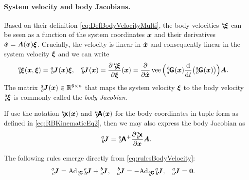 \paragraph{System velocity and body Jacobians.}
Based on their definition \eqref{eq:DefBodyVelocityMulti}, the body velocities $\bodyVel{\BidxI}{\BidxII}$ can be seen as a function of the system coordinates $\boldsymbol{x}$ and their derivatives $\dot{\boldsymbol{x}} = \boldsymbol{A}(\boldsymbol{x})\boldsymbol{\xi}$.
Crucially, the velocity is linear in $\dot{\boldsymbol{x}}$ and consequently linear in the system velocity $\boldsymbol{\xi}$ and we can write
\begin{align}\label{eq:DefBodyJacobian}
 \bodyVel{\BidxI}{\BidxII}(\sysCoord, \sysVel) &= \bodyJac{\BidxI}{\BidxII}(\sysCoord) \sysVel,&
 \bodyJac{\BidxI}{\BidxII}(\sysCoord) &= \pdiff[\,\bodyVel{\BidxI}{\BidxII}]{\sysVel}(\sysCoord) = \pdiff{\sysCoordd} \veeOp\Big( \bodyHomoCoord{\BidxII}{\BidxI}(\sysCoord) \diff{t} \big(\bodyHomoCoord{\BidxI}{\BidxII}(\sysCoord) \big) \Big) \kinMat.
\end{align}
The matrix $\bodyJac{\BidxI}{\BidxII}(\sysCoord) \in \RealNum^{6\times\dimConfigSpace}$ that maps the system velocity $\boldsymbol{\xi}$ to the body velocity $\bodyVel{\BidxI}{\BidxII}$ is commonly called the \textit{body Jacobian}.

If use the notation $\bodyCoord{\BidxI}{\BidxII}(\sysCoord)$ and $\bodyKinMat{\BidxI}{\BidxII}(\sysCoord)$ for the body coordinates in tuple form as defined in \eqref{eq:RBKinematicEq2}, then we may also express the body Jacobian as
\begin{align}
 \bodyJac{\BidxI}{\BidxII} = \bodyKinMat{\BidxI}{\BidxII}^+ \pdiff[\bodyCoord{\BidxI}{\BidxII}]{\sysCoord} \kinMat
 .
\end{align}

The following rules emerge directly from \eqref{eq:rulesBodyVelocity}:
\begin{align}\label{eq:rulesBodyJacobian}
 \bodyJac{\BidxI}{\BidxIII} &= \Ad{\bodyHomoCoord{\BidxIII}{\BidxII}} \bodyJac{\BidxI}{\BidxII} + \bodyJac{\BidxII}{\BidxIII},&
 \bodyJac{\BidxII}{\BidxI} &= -\Ad{\bodyHomoCoord{\BidxI}{\BidxII}} \bodyJac{\BidxI}{\BidxII},&
 \bodyJac{\BidxI}{\BidxI} &= \mat{0}.
\end{align}

